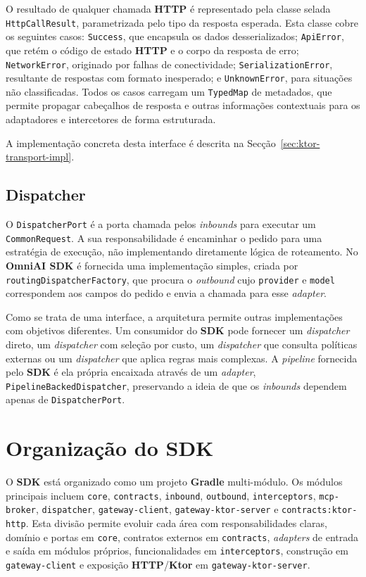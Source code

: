     O resultado de qualquer chamada \textbf{HTTP} é representado pela classe selada \texttt{HttpCallResult}, parametrizada pelo tipo da resposta esperada. Esta classe cobre os seguintes casos: \texttt{Success}, que encapsula os dados desserializados; \texttt{ApiError}, que retém o código de estado \textbf{HTTP} e o corpo da resposta de erro; \texttt{NetworkError}, originado por falhas de conectividade; \texttt{SerializationError}, resultante de respostas com formato inesperado; e \texttt{UnknownError}, para situações não classificadas. Todos os casos carregam um \texttt{TypedMap} de metadados, que permite propagar cabeçalhos de resposta e outras informações contextuais para os adaptadores e intercetores de forma estruturada.

    A implementação concreta desta interface é descrita na Secção~\ref{sec:ktor-transport-impl}.

    \subsection{Dispatcher}
    O \texttt{DispatcherPort} é a porta chamada pelos \textit{inbounds} para executar um \texttt{CommonRequest}. A sua responsabilidade é encaminhar o pedido para uma estratégia de execução, não implementando diretamente lógica de roteamento. No \textbf{OmniAI SDK} é fornecida uma implementação simples, criada por \texttt{routingDispatcherFactory}, que procura o \textit{outbound} cujo \texttt{provider} e \texttt{model} correspondem aos campos do pedido e envia a chamada para esse \textit{adapter}.

    Como se trata de uma interface, a arquitetura permite outras implementações com objetivos diferentes. Um consumidor do \textbf{SDK} pode fornecer um \textit{dispatcher} direto, um \textit{dispatcher} com seleção por custo, um \textit{dispatcher} que consulta políticas externas ou um \textit{dispatcher} que aplica regras mais complexas. A \textit{pipeline} fornecida pelo \textbf{SDK} é ela própria encaixada através de um \textit{adapter}, \texttt{PipelineBackedDispatcher}, preservando a ideia de que os \textit{inbounds} dependem apenas de \texttt{DispatcherPort}.

    \section{Organização do SDK}
    O \textbf{SDK} está organizado como um projeto \textbf{Gradle} multi-módulo. Os módulos principais incluem \texttt{core}, \texttt{contracts}, \texttt{inbound}, \texttt{outbound}, \texttt{interceptors}, \texttt{mcp-broker}, \texttt{dispatcher}, \texttt{gateway-}\allowbreak\texttt{client}, \texttt{gateway-}\allowbreak\texttt{ktor-server} e \texttt{contracts:ktor-http}. Esta divisão permite evoluir cada área com responsabilidades claras, domínio e portas em \texttt{core}, contratos externos em \texttt{contracts}, \textit{adapters} de entrada e saída em módulos próprios, funcionalidades em \texttt{interceptors}, construção em \texttt{gateway-client} e exposição \textbf{HTTP}/\textbf{Ktor} em \texttt{gateway-ktor-server}.

